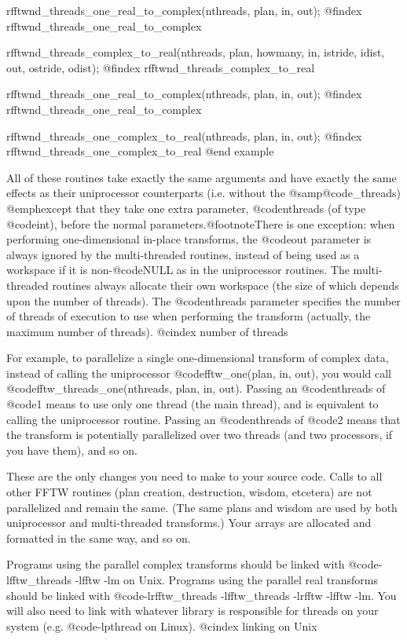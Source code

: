 rfftwnd_threads_one_real_to_complex(nthreads, plan, in, out);
@findex rfftwnd_threads_one_real_to_complex

rfftwnd_threads_complex_to_real(nthreads, plan, howmany, in,
                                istride, idist, out, ostride, odist);
@findex rfftwnd_threads_complex_to_real

rfftwnd_threads_one_real_to_complex(nthreads, plan, in, out);
@findex rfftwnd_threads_one_real_to_complex

rfftwnd_threads_one_complex_to_real(nthreads, plan, in, out);
@findex rfftwnd_threads_one_complex_to_real
@end example

All of these routines take exactly the same arguments and have exactly
the same effects as their uniprocessor counterparts (i.e. without the
@samp{@code{_threads}}) @emph{except} that they take one extra
parameter, @code{nthreads} (of type @code{int}), before the normal
parameters.@footnote{There is one exception: when performing
one-dimensional in-place transforms, the @code{out} parameter is always
ignored by the multi-threaded routines, instead of being used as a
workspace if it is non-@code{NULL} as in the uniprocessor routines.  The
multi-threaded routines always allocate their own workspace (the size of
which depends upon the number of threads).}  The @code{nthreads}
parameter specifies the number of threads of execution to use when
performing the transform (actually, the maximum number of threads).
@cindex number of threads

For example, to parallelize a single one-dimensional transform of
complex data, instead of calling the uniprocessor @code{fftw_one(plan,
in, out)}, you would call @code{fftw_threads_one(nthreads, plan, in,
out)}.  Passing an @code{nthreads} of @code{1} means to use only one
thread (the main thread), and is equivalent to calling the uniprocessor
routine.  Passing an @code{nthreads} of @code{2} means that the
transform is potentially parallelized over two threads (and two
processors, if you have them), and so on.

These are the only changes you need to make to your source code.  Calls
to all other FFTW routines (plan creation, destruction, wisdom,
etcetera) are not parallelized and remain the same.  (The same plans and
wisdom are used by both uniprocessor and multi-threaded transforms.)
Your arrays are allocated and formatted in the same way, and so on.

Programs using the parallel complex transforms should be linked with
@code{-lfftw_threads -lfftw -lm} on Unix.  Programs using the parallel
real transforms should be linked with @code{-lrfftw_threads
-lfftw_threads -lrfftw -lfftw -lm}.  You will also need to link with
whatever library is responsible for threads on your system
(e.g. @code{-lpthread} on Linux).
@cindex linking on Unix

